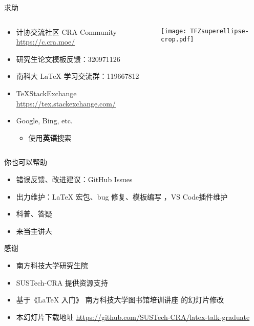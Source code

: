 \begin{frame}{求助}
  \begin{columns}[c]
    \begin{column}{.45\textwidth}
      \begin{itemize}
        \item 计协交流社区 CRA Community \url{https://c.cra.moe/}
        \item 研究生论文模板反馈：320971126
        \item 南科大 \LaTeX{} 学习交流群：119667812
        \item \TeX StackExchange \url{https://tex.stackexchange.com/}
        \item Google, Bing, etc.
          \begin{itemize}
            \item 使用\textbf{英语}搜索
          \end{itemize}
      \end{itemize}
    \end{column}
    \begin{column}{.45\textwidth}
      \texttt{[image: TFZsuperellipse-crop.pdf]}
    \end{column}
  \end{columns}
\end{frame}

\begin{frame}{你也可以帮助}
  \begin{itemize}
    \item 错误反馈、改进建议：GitHub Issues 
    \item 出力维护：\LaTeX{} 宏包、bug 修复、模板编写 ，VS Code插件维护 
    \item 科普、答疑
    \item \sout{来当主讲人}
  \end{itemize}
\end{frame}

\begin{frame}{感谢}
  \begin{itemize}
    \item 南方科技大学研究生院
    \item SUSTech-CRA 提供资源支持
    \item 基于《LaTeX 入门》 南方科技大学图书馆培训讲座  的幻灯片修改
    \item 本幻灯片下载地址 \url{https://github.com/SUSTech-CRA/latex-talk-graduate}
  \end{itemize}
\end{frame}
